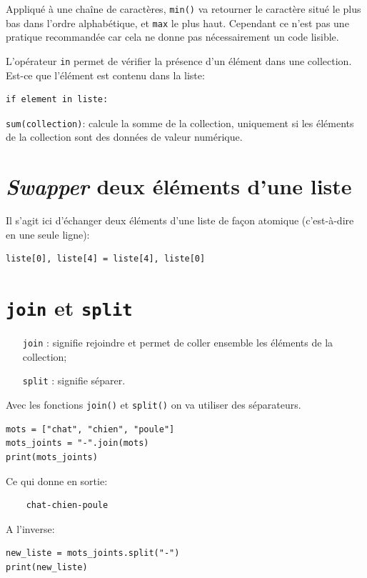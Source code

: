 \documentclass[a4paper,11pt]{book}
\begin{document}
Appliqué à une chaîne de caractères, \texttt{min()} va retourner le caractère situé le plus bas dans l'ordre alphabétique, et \texttt{max} le plus haut. Cependant ce n'est pas une pratique recommandée car cela ne donne pas nécessairement un code lisible.
\medskip

L'opérateur \texttt{in} permet de vérifier la présence d'un élément dans une collection. Est-ce que l'élément est contenu dans la liste:
\begin{lstlisting}
if element in liste:
\end{lstlisting}
\medskip

\texttt{sum(collection)}: calcule la somme de la collection, uniquement si les éléments de la collection sont des données de valeur numérique.
\medskip

\section{\textit{Swapper} deux éléments d'une liste}
Il s'agit ici d'échanger deux éléments d'une liste de façon atomique (c'est-à-dire en une seule ligne):
\begin{lstlisting}
liste[0], liste[4] = liste[4], liste[0]
\end{lstlisting}
\medskip

\section{\texttt{join} et \texttt{split}}
\begin{itemize}
	\item[\texttt{join}]: signifie \og rejoindre\fg{} et permet de coller ensemble les éléments de la collection;
	\item[\texttt{split}]: signifie \og séparer\fg{}. 
\end{itemize}
\medskip

Avec les fonctions \texttt{join()} et \texttt{split()} on va utiliser des séparateurs.
\begin{lstlisting}
mots = ["chat", "chien", "poule"]
mots_joints = "-".join(mots)
print(mots_joints)
\end{lstlisting}
\medskip

Ce qui donne en sortie:
\begin{verbatim}
    chat-chien-poule
\end{verbatim}
\medskip

A l'inverse:
\begin{lstlisting}
new_liste = mots_joints.split("-")
print(new_liste)
\end{lstlisting}
\medskip
\end{document}
